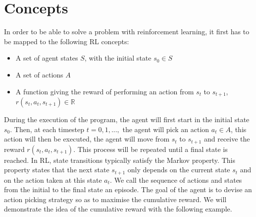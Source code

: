 \section{Concepts}
In order to be able to solve a problem with reinforcement learning, it first has to be mapped to the following RL concepts:
\begin{itemize}
	\item A set of agent states $S$, with the initial state $s_0\in S$
	\item A set of actions $A$
	\item A function giving the reward of performing an action from  $s_t$ to $s_{t+1}$, $r(s_t,a_t,s_{t+1})\in \mathbb{R}$
\end{itemize}
During the execution of the program, the agent will first start in the initial state $s_0$. Then, at each timestep $t=0,1,...,$ the agent will pick an action $a_t \in A$, this action will then be executed, the agent will move from $s_t$ to $s_{t+1}$ and receive the reward $r(s_t,a_t,s_{t+1})$. This process will be repeated until a final state is reached. In RL, state transitions typically satisfy the Markov property. This property states that the next state $s_{t+1}$ only depends on the current state $s_t$ and on the action taken at this state $a_t$. We call the sequence of actions and states from the initial to the final state an episode. The goal of the agent is to devise an action picking strategy so as to maximise the cumulative reward. We will demonstrate the idea of the cumulative reward with the following example.
